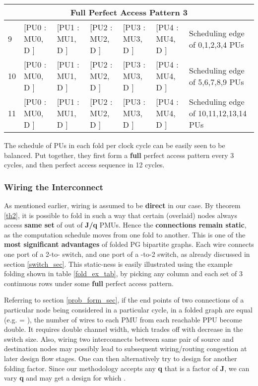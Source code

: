 \documentclass[12pt]{article}
\begin{document}
\begin{table}[!h]
{\begin{tabular}[!h]{|p{0.4cm}|p{2cm}|p{2cm}|p{2cm}|p{2cm}|p{2cm}|p{2.3cm}|}
\multicolumn{7}{|c|}{\textbf{Full} Perfect Access Pattern 3} \\ \hline \hline 
9 & [PU0 : MU0, D ] & [PU1 : MU1, D ] & [PU2 : MU2, D ] & [PU3 : MU3, D ] & [PU4 : MU4, D ] &  Scheduling  edge of {0,1,2,3,4} PUs \\ \hline 
10 & [PU0 : MU0, D ] & [PU1 : MU1, D ] & [PU2 : MU2, D ] & [PU3 : MU3, D ] & [PU4 : MU4, D ] & Scheduling  edge of {5,6,7,8,9} PUs \\ \hline 
11 & [PU0 : MU0, D ] & [PU1 : MU1, D ] & [PU2 : MU2, D ] & [PU3 : MU3, D ] & [PU4 : MU4, D ] & Scheduling  edge of {10,11,12,13,14} PUs \\ \hline

\end{tabular}
}
\end{table}

The schedule of PUs in each fold per clock cycle can be easily seen to be
balanced. Put together, they first form a \textbf{full} perfect access pattern every
3 cycles, and then perfect access sequence in 12 cycles.

\subsubsection{Wiring the Interconnect}
\label{wire_sec}
As mentioned earlier, wiring is assumed to be \textbf{direct} in our
case. By theorem \ref{th2}, it is possible to fold in such a way that
certain (overlaid) nodes always access \textbf{same set} of  out of
\textbf{J/q} PMUs. Hence the \textbf{connections remain static},
as the computation schedule moves from one fold to another. This is one of
the \textbf{most significant advantages} of folded PG bipartite graphs.
Each wire connects one port of a 2-to-
switch, and one port of a -to-2 switch, as already discussed in section \ref{switch_sec}. This
static-ness is easily illustrated using the example folding shown in table
\ref{fold_ex_tab}, by picking any column and each set of 3 continuous
rows under some \textbf{full} perfect access pattern.

Referring to section \ref{prob_form_sec}, if the end points of two
connections of a particular node being considered in a particular
cycle, in a folded graph are
equal (e.g.  = ), the number of wires to each
PMU from each reachable PPU become double. It requires
double channel width, which trades off with decrease in the switch size.
Also, wiring two interconnects between same pair of source and
destination nodes may possibly lead to subsequent
wiring/routing congestion at later design flow stages. One can then
alternatively try to design for another folding factor. Since our
methodology accepts any \textbf{q} that is a factor of \textbf{J}, we
can vary \textbf{q} and may get
a design for which   .
\end{document}
